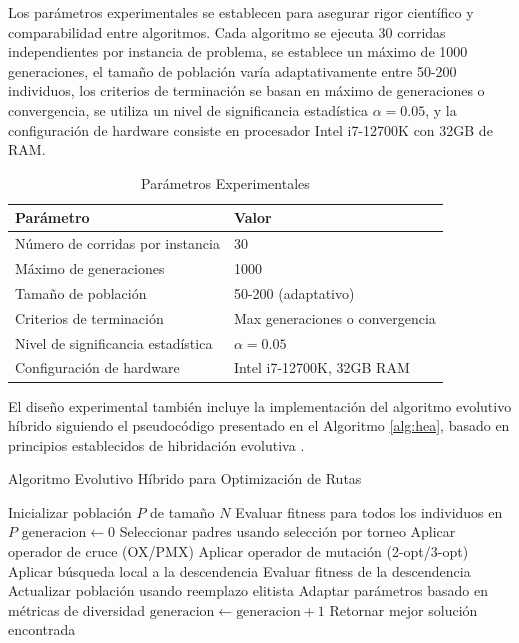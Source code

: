 \documentclass[12pt,a4paper]{article}
\begin{document}
Los parámetros experimentales se establecen para asegurar rigor científico y comparabilidad entre algoritmos. Cada algoritmo se ejecuta 30 corridas independientes por instancia de problema, se establece un máximo de 1000 generaciones, el tamaño de población varía adaptativamente entre 50-200 individuos, los criterios de terminación se basan en máximo de generaciones o convergencia, se utiliza un nivel de significancia estadística $\alpha = 0.05$, y la configuración de hardware consiste en procesador Intel i7-12700K con 32GB de RAM.

\begin{table}[H]
\centering
\caption{Parámetros Experimentales}
\begin{tabular}{@{}ll@{}}
\toprule
\textbf{Parámetro} & \textbf{Valor} \\
\midrule
Número de corridas por instancia & 30 \\
Máximo de generaciones & 1000 \\
Tamaño de población & 50-200 (adaptativo) \\
Criterios de terminación & Max generaciones o convergencia \\
Nivel de significancia estadística & $\alpha = 0.05$ \\
Configuración de hardware & Intel i7-12700K, 32GB RAM \\
\bottomrule
\end{tabular}
\label{tab:parameters}
\end{table}

El diseño experimental también incluye la implementación del algoritmo evolutivo híbrido siguiendo el pseudocódigo presentado en el Algoritmo \ref{alg:hea}, basado en principios establecidos de hibridación evolutiva \cite{alba2013}.

\begin{algorithm}[H]
\caption{Algoritmo Evolutivo Híbrido para Optimización de Rutas}
\label{alg:hea}
\begin{algorithmic}[1]
\STATE Inicializar población $P$ de tamaño $N$
\STATE Evaluar fitness para todos los individuos en $P$
\STATE $\text{generacion} \leftarrow 0$
    \STATE Seleccionar padres usando selección por torneo
    \STATE Aplicar operador de cruce (OX/PMX)
    \STATE Aplicar operador de mutación (2-opt/3-opt)
    \STATE Aplicar búsqueda local a la descendencia
    \STATE Evaluar fitness de la descendencia
    \STATE Actualizar población usando reemplazo elitista
    \STATE Adaptar parámetros basado en métricas de diversidad
    \STATE $\text{generacion} \leftarrow \text{generacion} + 1$
\ENDWHILE
\STATE Retornar mejor solución encontrada
\end{algorithmic}
\end{algorithm}
\end{document}
